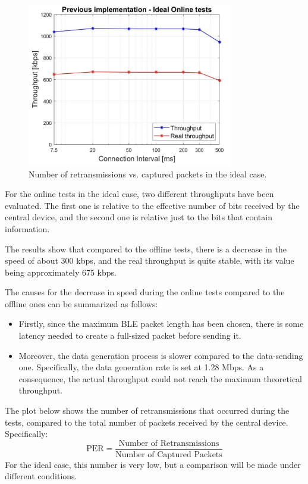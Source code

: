 \documentclass{Configuration_Files/PoliMi3i_thesis}
\begin{document}
\begin{figure}[h!]
    \centering
    \includegraphics[width=0.8\textwidth]{Results Manuel/figure2}
    \caption{Number of retransmissions vs. captured packets in the ideal case.}
    \label{fig:figure1}
\end{figure}

For the online tests in the ideal case, two different throughputs have been evaluated. The first one is relative to the effective number of bits received by the central device, and the second one is relative just to the bits that contain information.

The results show that compared to the offline tests, there is a decrease in the speed of about 300 kbps, and the real throughput is quite stable, with its value being approximately 675 kbps.

The causes for the decrease in speed during the online tests compared to the offline ones can be summarized as follows:
\begin{itemize}
    \item Firstly, since the maximum BLE packet length has been chosen, there is some latency needed to create a full-sized packet before sending it.
    \item Moreover, the data generation process is slower compared to the data-sending one. Specifically, the data generation rate is set at 1.28 Mbps. As a consequence, the actual throughput could not reach the maximum theoretical throughput.
\end{itemize}

The plot below shows the number of retransmissions that occurred during the tests, compared to the total number of packets received by the central device. Specifically:
\[
\text{PER} = \frac{\text{Number of Retransmissions}}{\text{Number of Captured Packets}}
\]
For the ideal case, this number is very low, but a comparison will be made under different conditions.
\end{document}
